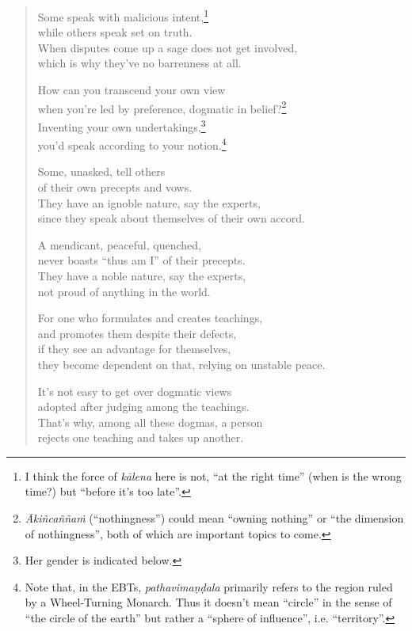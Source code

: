\documentclass[12pt,openany]{book}%
\begin{document}
\begin{verse}%
Some speak with malicious intent,\footnote{I think the force of \textit{\textsanskrit{kālena}} here is not, “at the right time” (when is the wrong time?) but “before it’s too late”. } \\
while others speak set on truth. \\
When disputes come up a sage does not get involved, \\
which is why they’ve no barrenness at all. 

How can you transcend your own view \\
when you’re led by preference, dogmatic in belief?\footnote{\textit{\textsanskrit{Ākiñcaññaṁ}} (“nothingness”) could mean “owning nothing” or “the dimension of nothingness”, both of which are important topics to come. } \\
Inventing your own undertakings,\footnote{Her gender is indicated below. } \\
you’d speak according to your notion.\footnote{Note that, in the EBTs, \textit{\textsanskrit{pathavimaṇḍala}} primarily refers to the region ruled by a Wheel-Turning Monarch. Thus it doesn’t mean “circle” in the sense of “the circle of the earth” but rather a “sphere of influence”, i.e. “territory”. } 

Some, unasked, tell others \\
of their own precepts and vows. \\
They have an ignoble nature, say the experts, \\
since they speak about themselves of their own accord. 

A mendicant, peaceful, quenched, \\
never boasts “thus am I” of their precepts. \\
They have a noble nature, say the experts, \\
not proud of anything in the world. 

For one who formulates and creates teachings, \\
and promotes them despite their defects, \\
if they see an advantage for themselves, \\
they become dependent on that, relying on unstable peace. 

It’s not easy to get over dogmatic views \\
adopted after judging among the teachings. \\
That’s why, among all these dogmas, a person \\
rejects one teaching and takes up another. 


\end{verse}
\end{document}
